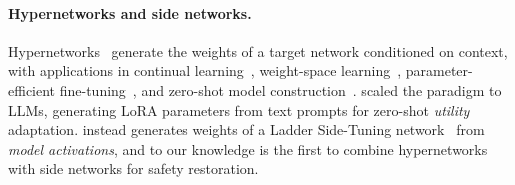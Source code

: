 \paragraph{Hypernetworks and side networks.}
Hypernetworks~\citep{ha2017hypernetworks, chauhan2024brief} generate the weights of a target network conditioned on context, with applications in continual learning~\citep{vonoswald2020continual}, weight-space learning~\citep{navon2023equivariant}, parameter-efficient fine-tuning~\citep{phang2023hypertuning, mahabadi2021parameterefficient}, and zero-shot model construction~\citep{knyazev2021graphhypernet}. \citet{liang2025dragdrop} scaled the paradigm to LLMs, generating LoRA parameters from text prompts for zero-shot \emph{utility} adaptation. \method{} instead generates weights of a Ladder Side-Tuning network~\citep{sung2022lst} from \textit{model activations}, and to our knowledge is the first to combine hypernetworks with side networks for safety restoration.
